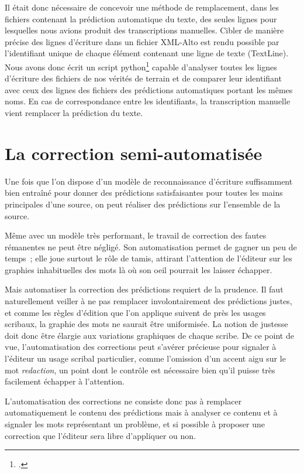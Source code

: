 \documentclass[a4paper,12pt,twoside]{book}
\begin{document}
				Il était donc nécessaire de concevoir une méthode de remplacement, dans les fichiers contenant la prédiction automatique du texte, des seules lignes pour lesquelles nous avions produit des transcriptions manuelles. Cibler de manière précise des lignes d'écriture dans un fichier XML-Alto est rendu possible par l'identifiant unique de chaque élément contenant une ligne de texte (\textsf{TextLine}). Nous avons donc écrit un script python\footcite{biayInjectTranscriptPy2022a} capable d'analyser toutes les lignes d'écriture des fichiers de nos vérités de terrain et de comparer leur identifiant avec ceux des lignes des fichiers des prédictions automatiques portant les mêmes noms. En cas de correspondance entre les identifiants, la transcription manuelle vient remplacer la prédiction du texte.
			
		\section{La correction semi-automatisée}
			Une fois que l'on dispose d'un modèle de reconnaissance d'écriture suffisamment bien entraîné pour donner des prédictions satisfaisantes pour toutes les mains principales d'une source, on peut réaliser des prédictions sur l'ensemble de la source.
			
			Même avec un modèle très performant, le travail de correction des fautes rémanentes ne peut être négligé. Son automatisation permet de gagner un peu de temps~; elle joue surtout le rôle de tamis, attirant l'attention de l'éditeur sur les graphies inhabituelles des mots là où son oeil pourrait les laisser échapper.
			
			Mais automatiser la correction des prédictions requiert de la prudence. Il faut naturellement veiller à ne pas remplacer involontairement des prédictions justes, et comme les règles d'édition que l'on applique suivent de près les usages scribaux, la graphie des mots ne saurait être uniformisée. La notion de justesse doit donc être élargie aux variations graphiques de chaque scribe. De ce point de vue, l'automatisation des corrections peut s'avérer précieuse pour signaler à l'éditeur un usage scribal particulier, comme l'omission d'un accent aigu sur le mot \textit{redaction}, un point dont le contrôle est nécessaire bien qu'il puisse très facilement échapper à l'attention.
			
			L'automatisation des corrections ne consiste donc pas à remplacer automatiquement le contenu des prédictions mais à analyser ce contenu et à signaler les mots représentant un problème, et si possible à proposer une correction que l'éditeur sera libre d'appliquer ou non.
			
\end{document}
